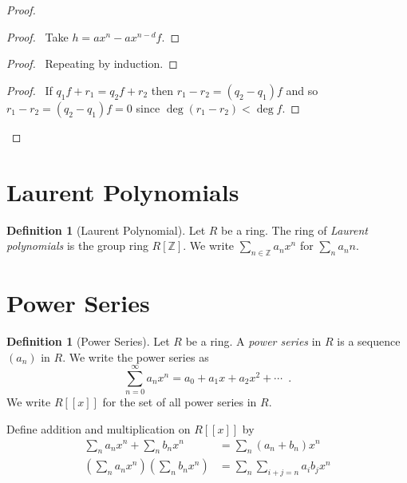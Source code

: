 \documentclass{book}
\let\qed\relax
\theoremstyle{definition}
\newtheorem{df}[prop]{Definition}
\begin{document}
\begin{proof}
\pf
{}
\begin{proof}
\pf\ Take $h = ax^n - ax^{n-d}f$.
\end{proof}
\begin{proof}
\pf\ Repeating  by induction.
\end{proof}
\begin{proof}
\pf\ If $q_1 f + r_1 = q_2 f + r_2$ then $r_1 - r_2 = (q_2 - q_1)f$ and so $r_1 - r_2 = (q_2 - q_1) f = 0$ since $\deg (r_1 - r_2) < \deg f$.
\end{proof}
\qed
\end{proof}

\section{Laurent Polynomials}

\begin{df}[Laurent Polynomial]
Let $R$ be a ring. The ring of \emph{Laurent polynomials} is the group ring $R[\mathbb{Z}]$. We write $\sum_{n \in \mathbb{Z}} a_n x^{n}$ for $\sum_n a_n n$.
\end{df}

\section{Power Series}

\begin{df}[Power Series]
Let $R$ be a ring. A \emph{power series} in $R$ is a sequence $(a_n)$ in $R$. We write the power series as
\[ \sum_{n=0}^{\infty} a_n x^n = a_0 + a_1 x + a_2 x^2 + \cdots \enspace . \]
We write $R[[x]]$ for the set of all power series in $R$.

Define addition and multiplication on $R[[x]]$ by
\begin{align*}
\sum_n a_n x^n + \sum_n b_n x^n & = \sum_n (a_n + b_n) x^n \\
\left( \sum_n a_n x^n \right) \left( \sum_n b_n x^n \right) & = \sum_n \sum_{i+j=n} a_i b_j x^n
\end{align*}
\end{df}
\end{document}
